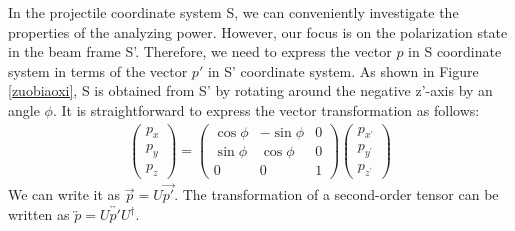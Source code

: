 \documentclass[twocolumn,twoside,showpacs,preprintnumbers,superscriptaddress,amsmath,amssymb,prc]{revtex4}
\begin{document}
In the projectile coordinate system S, we can conveniently investigate the properties of the analyzing power. However, our focus is on the polarization state in the beam frame S'. Therefore, we need to express the vector $p$ in S coordinate system in terms of the vector $p'$ in S' coordinate system. As shown in Figure \ref{zuobiaoxi}, S is obtained from S' by rotating around the negative z'-axis by an angle $\phi$. It is straightforward to express the vector transformation as follows:
\begin{align}
\left(\begin{array}{c}
p_x \\
p_y \\
p_z
\end{array}\right)=\left(\begin{array}{ccc}
\cos \phi & -\sin \phi & 0 \\
\sin \phi & \cos \phi & 0 \\
0 & 0 & 1
\end{array}\right)\left(\begin{array}{c}
p_{x^{\prime}} \\
p_{y^{\prime}} \\
p_{z^{\prime}}
\end{array}\right)
\end{align}
We can write it as $\overrightarrow{p} = U \overrightarrow{p'}$. The transformation of a second-order tensor can be written as $\overleftrightarrow{p} = U \overleftrightarrow{p'} U^\dagger$.
\end{document}
